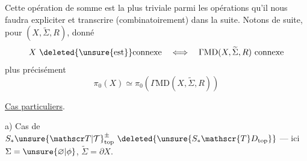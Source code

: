 Cette opération de somme est la plus triviale parmi les opérations qu'il nous faudra expliciter et transcrire (combinatoirement) dans la suite. Notons de suite, pour $(X,\widetilde{\Sigma},R)$, donné
\[
X\ \deleted{\unsure{\text{est}}}\text{connexe}
\quad\Longleftrightarrow\quad
\Gamma\mathrm{MD}(X,\widetilde{\Sigma},R)\ \text{connexe}
\]
plus précisément
\[
\pi_{0}(X)\simeq\pi_{0}(\Gamma\mathrm{MD}(X,\widetilde{\Sigma},R))
\]

\uline{Cas particuliers}.

a) Cas de $S_{*}{\unsure{\mathscr T|\mathcal T}}_{\mathrm{top}}^{\pm}\ \deleted{\unsure{S_{*}\mathscr{T}D_{\mathrm{top}}}}$ --- ici $\Sigma=\unsure{\varnothing|\phi}$, $\widetilde{\Sigma}=\partial X$.

